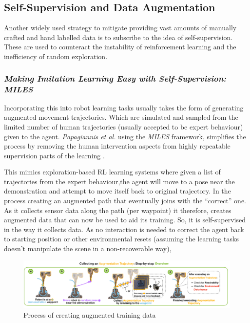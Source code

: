 \subsection{Self-Supervision and Data Augmentation}
Another widely used strategy to mitigate providing vast amounts of manually crafted and hand labelled data is to subscribe to the idea of self-supervision. These are used to counteract the instability of reinforcement learning and the inefficiency of random exploration.

\subsubsection{\emph{Making Imitation Learning Easy with Self-Supervision: MILES}}
Incorporating this into robot learning tasks usually takes the form of generating augmented movement trajectories. Which are simulated and sampled from the limited number of human trajectories (usually accepted to be expert behaviour) given to the agent. \emph{Papagiannis et al.} using the \emph{MILES} framework, simplifies the process by removing the human intervention aspects from highly repeatable supervision parts of the learning \cite{papagiannis2024milesmakingimitationlearning}. 

This mimics exploration-based RL learning systems where given a list of trajectories from the expert behaviour,the agent will move to a pose near the demonstration and attempt to move itself back to original trajectory. In the process creating an augmented path that eventually joins with the ``correct'' one. As it collects sensor data along the path (per waypoint) it therefore, creates augmented data that can now be used to aid its training. So, it is self-supervised in the way it collects data. As no interaction is needed to correct the agent back to starting position or other environmental resets (assuming the learning tasks doesn't manipulate the scene in a non-recoverable way),

\begin{figure}[h]
  \centering
  \includegraphics[width=\textwidth]{assets/rel-work/augmentation-miles.png}
  \caption{Process of creating augmented training data \cite{papagiannis2024milesmakingimitationlearning}}\label{fig:aug-miles}
\end{figure}

